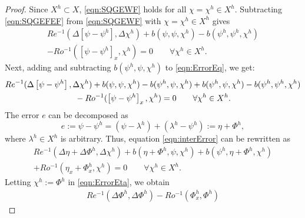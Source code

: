\begin{proof}
  Since $X^h \subset X$, \eqref{eqn:SQGEWF} holds for all $\chi = \chi^h\in X^h$.
  Subtracting \eqref{eqn:SQGEFEF} from \eqref{eqn:SQGEWF} with $\chi=\chi^h \in
  X^h$ gives
  \begin{equation}
    \begin{split}
      Re^{-1}(\Delta \left[\psi - \psi^h\right],\Delta \chi^h)
        + b(\psi,\psi,\chi^h) - b(\psi^h,\psi^h,\chi^h) \\
        - Ro^{-1} (\left[\psi-\psi^h\right]_x,\chi^h) = 0 \qquad \forall \chi^h \in
    X^h.
  \end{split}
    \label{eqn:ErrorEq}
  \end{equation}
  Next, adding and subtracting $b(\psi^h,\psi,\chi^h)$ to \eqref{eqn:ErrorEq},
  we get:
  \begin{equation}
    \begin{split}
      & Re^{-1} (\Delta \left[\psi - \psi^h\right], \Delta \chi^h)
        + b(\psi,\psi,\chi^h) - b(\psi^h,\psi,\chi^h) %
        + b(\psi^h,\psi,\chi^h) - b(\psi^h,\psi^h,\chi^h) \\
      & \hspace*{3.0cm} - Ro^{-1} (\left[\psi-\psi^h\right]_x,\chi^h) = 0
        \qquad \forall \chi^h \in X^h.
    \end{split}
    \label{eqn:interError}
  \end{equation}
  The error $e$ can be decomposed as
  \begin{equation}
    e:= \psi-\psi^h = (\psi-\lambda^h)+(\lambda^h-\psi^h):= \eta + \Phi^h,
    \label{eqn:ErrorTrick}
  \end{equation}
  where $\lambda^h\in X^h$ is arbitrary.
  Thus, equation \eqref{eqn:interError} can be
  rewritten as
  \begin{equation}
    \begin{split}
      Re^{-1}(\Delta \eta + \Delta \Phi^h, \Delta \chi^h)
        + b(\eta+\Phi^h,\psi,\chi^h) + b(\psi^h,\eta+\Phi^h,\chi^h) \\
      + Ro^{-1} (\eta_x+\Phi^h_x,\chi^h) = 0 \qquad \forall \chi^h \in X^h.
    \end{split}
    \label{eqn:ErrorEta}
  \end{equation}
  Letting $\chi^h := \Phi^h$ in \eqref{eqn:ErrorEta}, we obtain
  \begin{equation}
    \begin{split}
      Re^{-1} (\Delta \Phi^h, \Delta \Phi^h) - Ro^{-1} (\Phi^h_x,\Phi^h)

\end{split}
\end{equation}
\end{proof}
